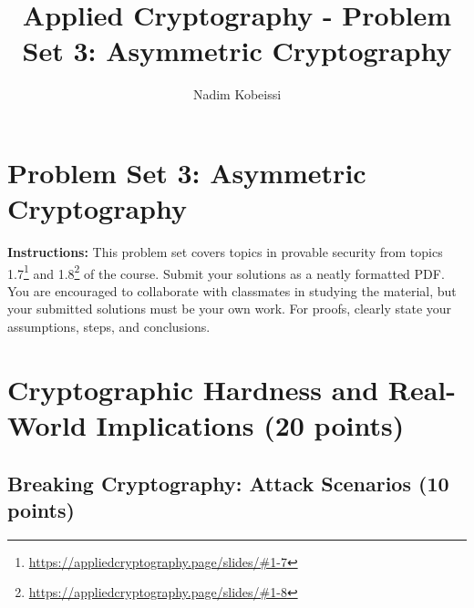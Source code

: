 \documentclass[10pt,a4paper,american]{exam}
\title{Applied Cryptography - Problem Set 3: Asymmetric Cryptography}
\author{Nadim Kobeissi}
\begin{document}
\classhandoutheader
\section*{Problem Set 3: Asymmetric Cryptography}

\begin{tcolorbox}[colframe=OliveGreen!30!white,colback=OliveGreen!5!white]
	\textbf{Instructions:} This problem set covers topics in provable security from topics 1.7\footnote{\url{https://appliedcryptography.page/slides/\#1-7}} and 1.8\footnote{\url{https://appliedcryptography.page/slides/\#1-8}} of the course. Submit your solutions as a neatly formatted PDF. You are encouraged to collaborate with classmates in studying the material, but your submitted solutions must be your own work. For proofs, clearly state your assumptions, steps, and conclusions.
\end{tcolorbox}

\section{Cryptographic Hardness and Real-World Implications (20 points)}

\subsection{Breaking Cryptography: Attack Scenarios (10 points)}
\end{document}
